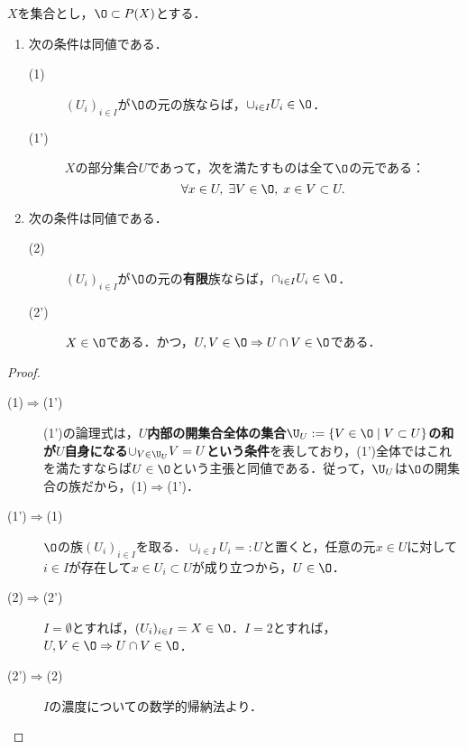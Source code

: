 \documentclass[uplatex,dvipdfmx]{jsreport}
\begin{document}
\begin{proposition}[開集合の公理の特徴付け]\label{prop-characterization-of-open-sets}
    $X$を集合とし，$\O\subset P(X)$とする．
    \begin{enumerate}
        \item 次の条件は同値である．\begin{description}
            \item[(1)] $(U_i)_{i\in I}$が$\O$の元の族ならば，$\cup_{i\in I}U_i\in\O$．
            \item[(1')] $X$の部分集合$U$であって，次を満たすものは全て$\O$の元である：\[\forall x\in U,\; \exists V\in\O,\;x\in V\subset U.\]
        \end{description}
        \item 次の条件は同値である．\begin{description}
            \item[(2)] $(U_i)_{i\in I}$が$\O$の元の\textbf{有限}族ならば，$\cap_{i\in I}U_i\in\O$．
            \item[(2')] $X\in\O$である．かつ，$U,V\in\O\Rightarrow U\cap V\in\O$である．
        \end{description}
    \end{enumerate}
\end{proposition}
\begin{proof}\mbox{}
    \begin{description}
        \item[(1)$\Rightarrow$(1')] (1')の論理式は，\textbf{$U$内部の開集合全体の集合$\U_U:=\{V\in\O\mid V\subset U\}$の和が$U$自身になる$\cup_{V\in\U_U}V=U$という条件}を表しており，(1')全体ではこれを満たすならば$U\in\O$という主張と同値である．従って，$\U_U$は$\O$の開集合の族だから，(1)$\Rightarrow$(1')．
        \item[(1')$\Rightarrow$(1)] $\O$の族$(U_i)_{i\in I}$を取る．$\cup_{i\in I}U_i=:U$と置くと，任意の元$x\in U$に対して$i\in I$が存在して$x\in U_i\subset U$が成り立つから，$U\in\O$．
        \item[(2)$\Rightarrow$(2')] $I=\emptyset$とすれば，$(U_i)_{i\in I}=X\in\O$．$I=2$とすれば，$U,V\in\O\Rightarrow U\cap V\in\O$．
        \item[(2')$\Rightarrow$(2)] $I$の濃度についての数学的帰納法より．
    \end{description}
\end{proof}
\end{document}
